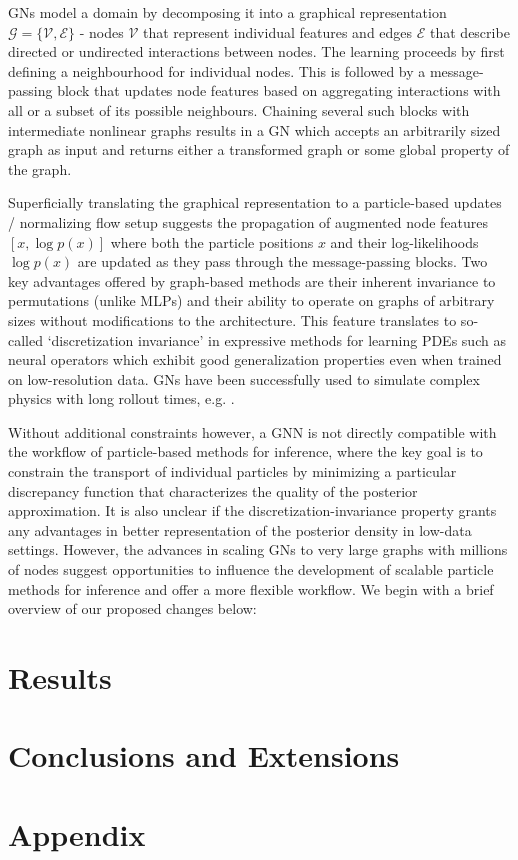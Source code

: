 \documentclass[12pt]{article}
\renewcommand{\[}{\left[}
\renewcommand{\]}{\right]}
\renewcommand{\(}{\left(}
\renewcommand{\)}{\right)}
\newcommand{\CE}{\mathcal{E}}
\newcommand{\CG}{\mathcal{G}}
\newcommand{\CV}{\mathcal{V}}
\begin{document}
GNs model a domain by decomposing it into a graphical representation $\CG=\{\CV, \CE\}$ - nodes $\CV$ that represent individual features and edges $\CE$ that describe directed or undirected interactions between nodes. 
The learning proceeds by first defining a neighbourhood for individual nodes. This is followed by a message-passing block that updates node features based on aggregating interactions with all or a subset of its possible neighbours. Chaining several such blocks with intermediate nonlinear graphs results in a GN which accepts an arbitrarily sized graph as input and returns either a transformed graph or some global property of the graph. 

Superficially translating the graphical representation to a particle-based updates / normalizing flow setup suggests the propagation of augmented node features $[x, \log p(x)]$ where both the particle positions $x$ and their log-likelihoods $\log p(x)$ are updated as they pass through the message-passing blocks. Two key advantages offered by graph-based methods are their inherent invariance to permutations (unlike MLPs) and their ability to operate on graphs of arbitrary sizes without modifications to the architecture. 
This feature translates to so-called `discretization invariance' in expressive methods for learning PDEs such as neural operators \citep{Li2020} which exhibit good generalization properties even when trained on low-resolution data. GNs have been successfully used to simulate complex physics with long rollout times, e.g. \cite{sanchez-gonzalez_learning_2020}.

Without additional constraints however, a GNN is not directly compatible with the workflow of particle-based methods for inference, where the key goal is to constrain the transport of individual particles by minimizing a particular discrepancy function that characterizes the quality of the posterior approximation. 
It is also unclear if the discretization-invariance property grants any advantages in better representation of the posterior density in low-data settings. 
However, the advances in scaling GNs to very large graphs with millions of nodes suggest opportunities to influence the development of scalable particle methods for inference and offer a more flexible workflow. 
We begin with a brief overview of our proposed changes below:



\section{Results}

\section{Conclusions and Extensions}






\section*{Appendix}
\end{document}
